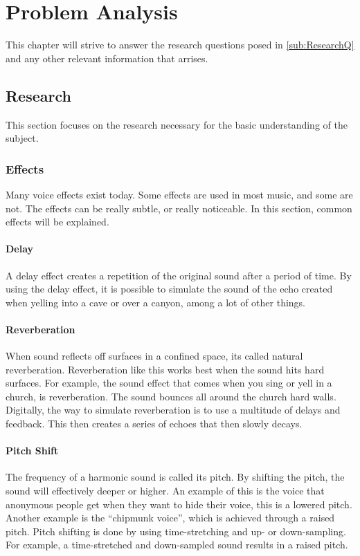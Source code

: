\chapter{Problem Analysis}
This chapter will strive to answer the research questions posed in \ref{sub:ResearchQ} and any other relevant information that arrises. 


\section{Research}
This section focuses on the research necessary for the basic understanding of the subject.  
\subsection{Effects}
Many voice effects exist today. Some effects are used in most music, and some are not. The effects can be really subtle, or really noticeable.
In this section, common effects will be explained.


\subsubsection{Delay}

A delay effect creates a repetition of the original sound after a period of time\citep{Loeffler_2014}. By using the delay effect, it is possible to simulate the sound of the echo created when yelling into a cave or over a canyon, among a lot of other things.

\subsubsection{Reverberation}

When sound reflects off surfaces in a confined space, its called natural reverberation\citep{Redmon_1997}. Reverberation like this works best when the sound hits hard surfaces. For example, the sound effect that comes when you sing or yell in a church, is reverberation. The sound bounces all around the church hard walls.
Digitally, the way to simulate reverberation is to use a multitude of delays and feedback. This then creates a series of echoes that then slowly decays.

\subsubsection{Pitch Shift}

The frequency of a harmonic sound is called its pitch\citep{Katjaas_00}. By shifting the pitch, the sound will effectively deeper or higher. An example of this is the voice that anonymous people get when they want to hide their voice, this is a lowered pitch. Another example is the “chipmunk voice”, which is achieved through a raised pitch.
Pitch shifting is done by using time-stretching and up- or down-sampling. For example, a time-stretched and down-sampled sound results in a raised pitch.\\

